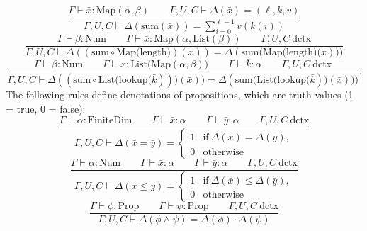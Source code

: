 \documentclass[11pt]{article}
\begin{document}
\begin{equation}
	\frac{
		\Gamma \vdash \bar{x} : \text{Map}(\alpha, \beta)
		\qquad \Gamma,U,C \vdash \Delta(\bar{x}) = (\ell, k, v)
	}{
		\Gamma,U,C \vdash \Delta(\text{sum}(\bar{x}))
		= \sum_{i=0}^{\ell-1} v(k(i))
	}
\end{equation}
\begin{equation}
	\frac{
		\Gamma \vdash \beta : \text{Num}
		\qquad \Gamma \vdash \bar{x} : \text{Map}(\alpha, \text{List}(\beta))
		\qquad \Gamma,U,C\ \text{dctx}
	}{
		\Gamma,U,C \vdash \Delta((\text{sum} \circ \text{Map(length)})(\bar{x}))
		= \Delta(\text{sum(Map(length)(}\bar{x})))
	}
\end{equation}
\begin{equation}
	\frac{
		\Gamma \vdash \beta : \text{Num}
		\qquad \Gamma \vdash \bar{x} : \text{List(Map}(\alpha, \beta))
		\qquad \Gamma \vdash \bar{k} : \alpha
		\qquad \Gamma,U,C\ \text{dctx}
	}{
		\Gamma,U,C \vdash \Delta((\text{sum} \circ \text{List(lookup(}\bar{k})))(\bar{x}))
		= \Delta(\text{sum(List(lookup(}\bar{k}))(\bar{x})))
	}.
\end{equation}
The following rules define denotations of propositions, which are truth values
(1 = true, 0 = false):
\begin{equation}
	\frac{
		\Gamma \vdash \alpha : \text{FiniteDim}
		\qquad \Gamma \vdash \bar{x} : \alpha
		\qquad \Gamma \vdash \bar{y} : \alpha
		\qquad \Gamma,U,C\ \text{dctx}
	}{
		\Gamma,U,C \vdash \Delta(\bar{x} = \bar{y})
		= \begin{cases}
			1 & \text{if}\ \Delta(\bar{x}) = \Delta(\bar{y}), \\
			0 & \text{otherwise}
		\end{cases}
	}
\end{equation}
\begin{equation}
	\frac{
		\Gamma \vdash \alpha : \text{Num}
		\qquad \Gamma \vdash \bar{x} : \alpha
		\qquad \Gamma \vdash \bar{y} : \alpha
		\qquad \Gamma,U,C\ \text{dctx}
	}{
		\Gamma,U,C \vdash \Delta(\bar{x} \leq \bar{y})
		= \begin{cases}
			1 & \text{if}\ \Delta(\bar{x}) \leq \Delta(\bar{y}), \\
			0 & \text{otherwise}
		\end{cases}
	}
\end{equation}
\begin{equation}
	\frac{
		\Gamma \vdash \phi : \text{Prop}
		\qquad \Gamma \vdash \psi : \text{Prop}
		\qquad \Gamma,U,C\ \text{dctx}
	}{
		\Gamma,U,C \vdash \Delta(\phi \wedge \psi) = \Delta(\phi) \cdot \Delta(\psi)
	}
\end{equation}
\end{document}

